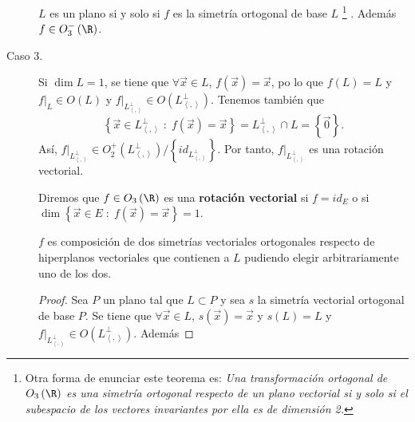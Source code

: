 \begin{description}
\begin{itemize}
	\end{itemize}
\begin{ftheorem}[]
	\normalfont  $\displaystyle L $ es un plano si y solo si $\displaystyle f $ es la simetría ortogonal de base $\displaystyle L $ \footnote{Otra forma de enunciar este teorema es: \textit{Una transformación ortogonal de $\displaystyle O_{3}\left(\R\right) $ es una simetría ortogonal respecto de un plano vectorial si y solo si el subespacio de los vectores invariantes por ella es de dimensión 2.}} . Además $\displaystyle f \in O^{-}_{3}\left(\R\right) $.
\end{ftheorem}
\item[Caso 3.] Si $\displaystyle \dim L = 1 $, se tiene que $\displaystyle \forall \vec{x} \in L $, $\displaystyle f\left(\vec{x}\right) = \vec{x} $, po lo que $\displaystyle f\left(L\right) = L $ y $\displaystyle f|_{L} \in O\left(L\right) $ y $\displaystyle f|_{L^{\perp }_{\left\langle ,  \right\rangle }} \in O\left(L^{\perp }_{\left\langle ,  \right\rangle }\right) $. Tenemos también que 
	\[ \left\{ \vec{x} \in L^{\perp }_{\left\langle ,  \right\rangle } \; : \; f\left(\vec{x}\right) = \vec{x}\right\} = L^{\perp }_{\left\langle ,  \right\rangle }\cap L = \left\{ \vec{0}\right\}  .\]
	Así, $\displaystyle f|_{L^{\perp }_{\left\langle ,  \right\rangle }} \in O^{+}_{2}\left(L^{\perp }_{\left\langle ,  \right\rangle }\right) / \left\{ id _{L^{\perp }_{\left\langle ,  \right\rangle }}\right\}  $. Por tanto, $\displaystyle f|_{L^{\perp }_{\left\langle ,  \right\rangle }} $ es una rotación vectorial.
	\begin{fdefinition}
		\normalfont Diremos que $\displaystyle f \in O_{3}\left(\R\right) $ es una \textbf{rotación vectorial} si $\displaystyle f = id _{E} $ o si $\displaystyle \dim \left\{ \vec{x} \in E \; : \; f\left(\vec{x}\right) = \vec{x}\right\} = 1 $. 
	\end{fdefinition}
	\begin{ftheorem}[]
	\normalfont $\displaystyle f $ es composición de dos simetrías vectoriales ortogonales respecto de hiperplanos vectoriales que contienen a $\displaystyle L $ pudiendo elegir arbitrariamente uno de los dos.
	\end{ftheorem}
	\begin{proof}
	Sea $\displaystyle P $ un plano tal que $\displaystyle L \subset P $ y sea $\displaystyle s $ la simetría vectorial ortogonal de base $\displaystyle P $. Se tiene que $\displaystyle \forall \vec{x} \in L $, $\displaystyle s\left(\vec{x}\right)=\vec{x} $ y $\displaystyle s\left(L\right) = L $ y $\displaystyle f|_{L^{\perp }_{\left\langle ,  \right\rangle }} \in O\left(L^{\perp }_{\left\langle ,  \right\rangle }\right) $. Además

\end{proof}
\end{description}
